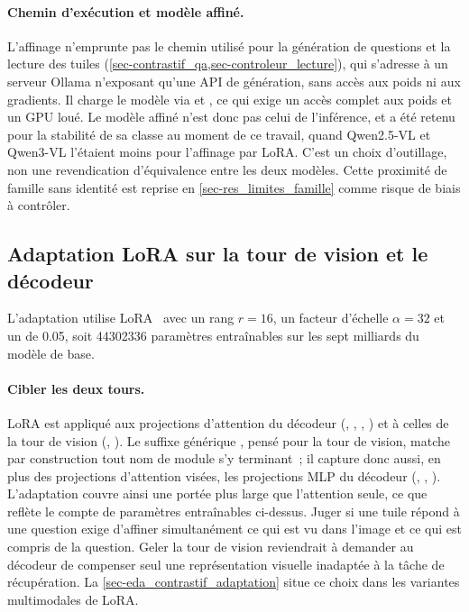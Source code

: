 \paragraph{Chemin d'exécution et modèle affiné.} L'affinage n'emprunte pas le
chemin utilisé pour la génération de questions et la lecture des tuiles
(\cref{sec-contrastif_qa,sec-controleur_lecture}), qui s'adresse à un serveur
Ollama n'exposant qu'une API de génération, sans accès aux poids ni aux
gradients. Il charge le modèle via  et , ce qui
exige un accès complet aux poids et un GPU loué. Le modèle affiné n'est donc pas
celui de l'inférence, et  a été retenu pour la
stabilité de sa classe  au moment de ce travail, quand Qwen2.5-VL et
Qwen3-VL l'étaient moins pour l'affinage par LoRA. C'est un choix d'outillage,
non une revendication d'équivalence entre les deux modèles. Cette proximité de
famille sans identité est reprise en \cref{sec-res_limites_famille} comme risque
de biais à contrôler.
 
\subsection{Adaptation LoRA sur la tour de vision et le décodeur}
\label{sec-contrastif_lora}
 
L'adaptation utilise LoRA~\citep{lora2021} avec un rang $r = 16$, un facteur
d'échelle $\alpha = 32$ et un  de \num{0.05}, soit
\num{44 302 336} paramètres entraînables sur les sept milliards du
modèle de base.
 
\paragraph{Cibler les deux tours.} LoRA est appliqué aux projections d'attention
du décodeur (, , , ) et à
celles de la tour de vision (, ). Le suffixe générique
, pensé pour la tour de vision, matche par construction tout nom de
module s'y terminant~; il capture donc aussi, en plus des projections
d'attention visées, les projections MLP du décodeur (,
, ). L'adaptation couvre ainsi une portée plus
large que l'attention seule, ce que reflète le compte de paramètres
entraînables ci-dessus. Juger si une tuile répond
à une question exige d'affiner simultanément ce qui est vu dans l'image et ce qui
est compris de la question. Geler la tour de vision reviendrait à demander au
décodeur de compenser seul une représentation visuelle inadaptée à la tâche de
récupération. La \cref{sec-eda_contrastif_adaptation} situe ce choix dans les
variantes multimodales de LoRA.
 
